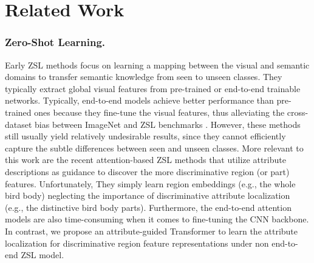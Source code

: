 \documentclass[letterpaper]{article} %
\begin{document}
	\section{Related Work}\label{sec2}
	\subsubsection{Zero-Shot Learning.}\label{sec2.1} Early ZSL methods \cite{Song2018TransductiveUE,Li2018DiscriminativeLO,Xian2018FeatureGN,Xian2019FVAEGAND2AF,Yu2020EpisodeBasedPG,Min2020DomainAwareVB,Han2021ContrastiveEF,Chen2021FREE,Chou2021AdaptiveAG, Han2021ContrastiveEF} focus on learning a mapping between the visual and semantic domains to transfer semantic knowledge from seen to unseen classes. They typically extract global visual features from pre-trained or end-to-end trainable networks. Typically, end-to-end models achieve better performance than pre-trained ones because they fine-tune the visual features, thus alleviating the cross-dataset bias between ImageNet and ZSL benchmarks \cite{Chen2021FREE,Xian2019FVAEGAND2AF}.  However, these methods still usually yield relatively undesirable results, since they cannot efficiently capture the subtle differences between seen and unseen classes. More relevant to this work are the recent attention-based ZSL methods \cite{Xie2019AttentiveRE,Xie2020RegionGE,Zhu2019SemanticGuidedML,Xu2020AttributePN,Liu2021GoalOrientedGE} that utilize attribute descriptions as guidance to discover the more discriminative region (or part) features. Unfortunately, They simply learn region embeddings (e.g., the whole bird body) neglecting the importance of discriminative attribute localization (e.g., the distinctive bird body parts). Furthermore, the end-to-end attention models are also time-consuming when it comes to fine-tuning the CNN backbone. In contrast, we propose an attribute-guided Transformer to learn the attribute localization for discriminative region feature representations under non end-to-end ZSL model.
	
\end{document}
